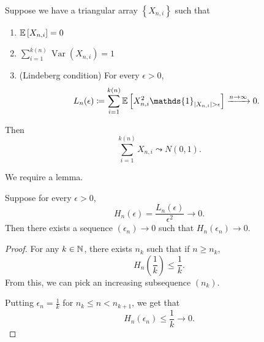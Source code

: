 \begin{theorem} \label{2-17-0}
	Suppose we have a triangular array $\left\{X_{n,i}\right\}$ such that
	\begin{enumerate}[label=(\roman*)]
		\item $\mathbb{E}\left[X_{n,i}\right] =0$
		\item $\sum\limits_{i=1}^{k(n)} \operatorname{Var}\left(X_{n,i}\right) = 1$
		\item (Lindeberg condition) For every $\epsilon > 0$, \[
			L_n(\epsilon) \coloneqq \sum\limits_{i=1}^{k(n)} \E\left[X_{n,i}^2 \mathds{1}_{\left| X_{n,i} \right| > \epsilon}\right] \xrightarrow{n \to \infty} 0
		.\] 
	\end{enumerate}
	Then \[
		\sum\limits_{i=1}^{k(n)} X_{n,i} \leadsto N(0,1)
	.\] 
\end{theorem}

We require a lemma.
\begin{lemma} \label{2-17-1}
	Suppose for every $\epsilon > 0$, \[
		H_n(\epsilon) = \frac{L_n(\epsilon)}{\epsilon^2} \to 0
	.\] Then there exists a sequence $\left( \epsilon_n \right) \to 0$ such that $H_n(\epsilon_n) \to 0$.
\end{lemma}
\begin{proof}
	For any $k \in \mathbb{N}$, there exists $n_k$ such that if $n \ge n_k$, \[
		H_n(\frac{1}{k}) \le \frac{1}{k}
	.\] From this, we can pick an increasing subsequence $\left( n_k \right)$.

	Putting $\epsilon_n = \frac{1}{k}$ for $n_k \le n < n_{k+1}$, we get that \[
		H_n(\epsilon_n) \le \frac{1}{k} \to 0
	.\] 
\end{proof}

